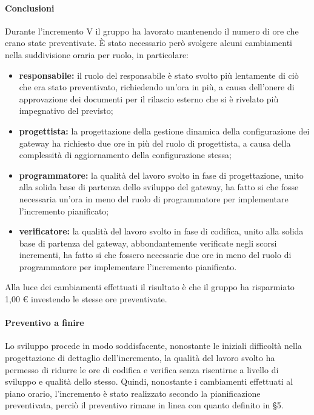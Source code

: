		\paragraph{Conclusioni}
			Durante l'incremento V il gruppo ha lavorato mantenendo il numero di ore che erano state preventivate. È stato necessario però svolgere alcuni cambiamenti nella suddivisione oraria per ruolo, in particolare:
			\begin{itemize}
				\item \textbf{responsabile:} il ruolo del responsabile è stato svolto più lentamente di ciò che era stato preventivato, richiedendo un'ora in più, a causa dell'onere di approvazione dei documenti per il rilascio esterno che si è rivelato più impegnativo del previsto;
				\item \textbf{progettista:} la progettazione della gestione dinamica della configurazione dei gateway ha richiesto due ore in più del ruolo di progettista, a causa della complessità di aggiornamento della configurazione stessa;
				\item \textbf{programmatore:} la qualità del lavoro svolto in fase di progettazione, unito alla solida base di partenza dello sviluppo del gateway, ha fatto si che fosse necessaria un'ora in meno del ruolo di programmatore per implementare l'incremento pianificato;
				\item \textbf{verificatore:} la qualità del lavoro svolto in fase di codifica, unito alla solida base di partenza del gateway, abbondantemente verificate negli scorsi incrementi, ha fatto si che fossero necessarie due ore in meno del ruolo di programmatore per implementare l'incremento pianificato.
			\end{itemize}
			Alla luce dei cambiamenti effettuati il risultato è che il gruppo ha risparmiato 1,00 € investendo le stesse ore preventivate.
		
		\paragraph{Preventivo a finire}
			Lo sviluppo procede in modo soddisfacente, nonostante le iniziali difficoltà nella progettazione di dettaglio dell'incremento, la qualità del lavoro svolto ha permesso di ridurre le ore di codifica e verifica senza risentirne a livello di sviluppo e qualità dello stesso.
			\newline
			Quindi, nonostante i cambiamenti effettuati al piano orario, l'incremento è stato realizzato secondo la pianificazione preventivata, perciò il preventivo rimane in linea con quanto definito in \S5.
			\pagebreak
			
